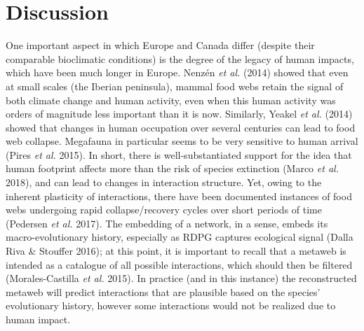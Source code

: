 \documentclass[11pt]{article}
\begin{document}
\hypertarget{discussion}{%
\section{Discussion}\label{discussion}}

One important aspect in which Europe and Canada differ (despite their
comparable bioclimatic conditions) is the degree of the legacy of human
impacts, which have been much longer in Europe. Nenzén \emph{et al.}
(2014) showed that even at small scales (the Iberian peninsula), mammal
food webs retain the signal of both climate change and human activity,
even when this human activity was orders of magnitude less important
than it is now. Similarly, Yeakel \emph{et al.} (2014) showed that
changes in human occupation over several centuries can lead to food web
collapse. Megafauna in particular seems to be very sensitive to human
arrival (Pires \emph{et al.} 2015). In short, there is
well-substantiated support for the idea that human footprint affects
more than the risk of species extinction (Marco \emph{et al.} 2018), and
can lead to changes in interaction structure. Yet, owing to the inherent
plasticity of interactions, there have been documented instances of food
webs undergoing rapid collapse/recovery cycles over short periods of
time (Pedersen \emph{et al.} 2017). The embedding of a network, in a
sense, embeds its macro-evolutionary history, especially as RDPG
captures ecological signal (Dalla Riva \& Stouffer 2016); at this point,
it is important to recall that a metaweb is intended as a catalogue of
all possible interactions, which should then be filtered
(Morales-Castilla \emph{et al.} 2015). In practice (and in this
instance) the reconstructed metaweb will predict interactions that are
plausible based on the species' evolutionary history, however some
interactions would not be realized due to human impact.
\end{document}
